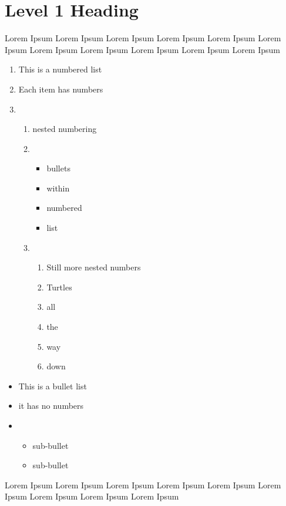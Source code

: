 \documentclass{article}
\begin{document}
\section{Level 1 Heading}

Lorem Ipsum Lorem Ipsum Lorem Ipsum Lorem Ipsum Lorem Ipsum Lorem Ipsum Lorem Ipsum Lorem Ipsum Lorem Ipsum Lorem Ipsum Lorem Ipsum

\begin{enumerate}
    \item This is a numbered list
    \item Each item has numbers
    \item \begin{enumerate}
        \item nested numbering
        \item \begin{itemize}
            \item bullets
            \item within 
            \item numbered
            \item list
        \end{itemize}
        \item \begin{enumerate}
            \item Still more nested numbers
            \item Turtles
            \item all 
            \item the 
            \item way 
            \item down
        \end{enumerate}
    \end{enumerate}
\end{enumerate}

\begin{itemize}
    \item This is a bullet list
    \item it has no numbers
    \item \begin{itemize}
        \item sub-bullet
        \item sub-bullet
    \end{itemize}
\end{itemize}
Lorem Ipsum Lorem Ipsum Lorem Ipsum Lorem Ipsum Lorem Ipsum Lorem Ipsum Lorem Ipsum Lorem Ipsum Lorem Ipsum
\end{document}

